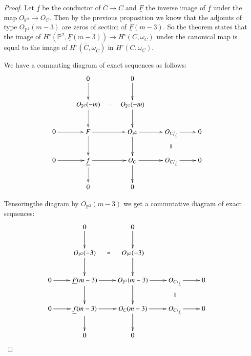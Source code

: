 \begin{proof}
Let $\underline{f}$ be the conductor of $\bar{C}\longrightarrow C$ and
$\underline{F}$ the inverse image of $\underline{f}$ under the map
$O_{\mathbb{P}^2}\longrightarrow O_C$. Then by the previous
proposition we know that the adjoints of type $O_{\mathbb{P}^2}(m-3)$
are zeros of section of $\underline{F}(m-3)$. So the theorem states
that the image of $H^\circ(\mathbb{P}^2,\underline{F}(m-3))
\longrightarrow H^\circ(C,\omega_C)$ under the canonical map is equal
to the image of $H^\circ(\bar{C},\omega_{\bar{C}})$ in $H^\circ(C,
\omega_C)$. 

We have a commuting diagram of exact sequences as follows:
\[
\xymatrix{
& 0\ar[d] & 0\ar [d]& & \\
& O_{\mathbb{P}^2}(-m)\ar[d]\ar@{}[r]|{=}& O_{\mathbb{P}^2}(-m)
\ar[d] & &\\ 
0 \ar[r] & F \ar[d] \ar[r] & O_{\mathbb{P}^2} \ar[d] \ar[r] &
O_{C/_{\underline{f}}}\ar @{}[d]|{\|} \ar[r] & 0\\
0 \ar[r] & \underline{f} \ar[d] \ar[r] & O_C \ar[d] \ar[r] &
O_{C/_{\underline{f}}} \ar[r] & 0\\
& 0 & 0 & &
}
\]

Tensoring\pageoriginale the diagram by $O_{\mathbb{P}^2}(m-3)$ we get
a commutative diagram of exact sequences:
\[
\xymatrix{
& 0 \ar[d] & 0 \ar[d] & &\\
& O_{\mathbb{P}^2}(-3) \ar @{} [r] |{=} \ar[d]& O_{\mathbb{P}^2}(-3) \ar[d]
& &\\
0 \ar[r] & \underline{F}(m-3) \ar[d] \ar[r] & O_{\mathbb{P}^2}(m-3)
\ar[d] \ar[r] & O_{C/_{\underline{f}}} \ar[r] \ar @{} [d]|{\|} & 0\\
0 \ar[r] & \underline{f}(m-3) \ar[d] \ar[r] & O_C(m-3) \ar[d] \ar[r] &
O_{C/_{\underline{f}}} \ar[r] & 0\\
& 0 & 0 & &
}
\]


\end{proof}
